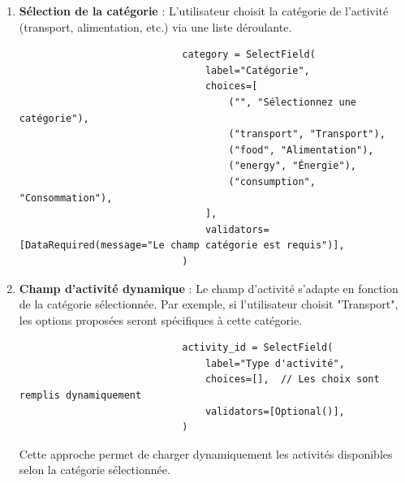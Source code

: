 \documentclass[a4paper,11pt]{article}
\begin{document}
                \begin{enumerate}
                    \item \textbf{Sélection de la catégorie} : L'utilisateur choisit la catégorie de l'activité (transport, alimentation, etc.) via une liste déroulante.
                    \begin{tcolorbox}[colback=lightgray!6, colframe=black, left=-45mm, right=5mm, top=2mm, bottom=0mm, boxrule=0.1mm]
                        \begin{verbatim}
                            category = SelectField(
                                label="Catégorie",
                                choices=[
                                    ("", "Sélectionnez une catégorie"),
                                    ("transport", "Transport"),
                                    ("food", "Alimentation"),
                                    ("energy", "Énergie"),
                                    ("consumption", "Consommation"),
                                ],
                                validators=[DataRequired(message="Le champ catégorie est requis")],
                            )
                        \end{verbatim}
                    \end{tcolorbox}

                    \item \textbf{Champ d'activité dynamique} : Le champ d'activité s'adapte en fonction de la catégorie sélectionnée. Par exemple, si l'utilisateur choisit "Transport", les options proposées seront spécifiques à cette catégorie.

                    \begin{tcolorbox}[colback=lightgray!6, colframe=black, left=-45mm, right=5mm, top=2mm, bottom=0mm, boxrule=0.1mm]
                        \begin{verbatim}
                            activity_id = SelectField(
                                label="Type d'activité",
                                choices=[],  // Les choix sont remplis dynamiquement
                                validators=[Optional()],
                            )
                        \end{verbatim}
                    \end{tcolorbox}

                    \noindent Cette approche permet de charger dynamiquement les activités disponibles selon la catégorie sélectionnée.


\end{enumerate}
\end{document}
